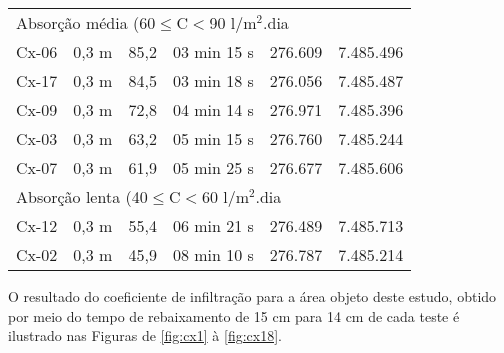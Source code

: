 \begin{longtable}{@{\hspace{1cm}} cc cc cc}
	\multicolumn{6}{l}{Absorção média (60$\leq$C$<$90 l/m$^2$.dia}	\\\cmidrule{1-2}
Cx-06 & 0,3 m & 85,2 & 03 min 15 s &  276.609  &  7.485.496\\
Cx-17 & 0,3 m & 84,5 & 03 min 18 s &  276.056  &  7.485.487\\ 
Cx-09 & 0,3 m & 72,8 & 04 min 14 s &  276.971  &  7.485.396\\ 
Cx-03 & 0,3 m & 63,2 & 05 min 15 s &  276.760  &  7.485.244\\ 
Cx-07 & 0,3 m & 61,9 & 05 min 25 s &  276.677  &  7.485.606\\ 
	\multicolumn{6}{l}{Absorção lenta (40$\leq$C$<$60 l/m$^2$.dia}	\\\cmidrule{1-2}
Cx-12 & 0,3 m & 55,4 & 06 min 21 s &  276.489  &  7.485.713 \\
Cx-02 & 0,3 m & 45,9 & 08 min 10 s &  276.787  &  7.485.214 \\
\end{longtable}

O resultado do coeficiente de infiltração para a área objeto deste 
estudo, obtido por meio do tempo de rebaixamento de 15 cm para 14 cm 
de cada teste é ilustrado nas Figuras de \ref{fig:cx1} à 
\ref{fig:cx18}.

